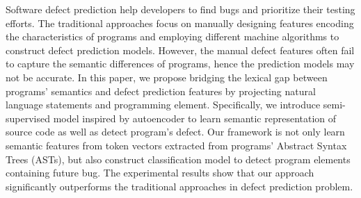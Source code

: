 

Software defect prediction help developers to find bugs and prioritize their testing efforts. The traditional approaches focus on manually designing features encoding the characteristics of programs and employing different machine algorithms to construct defect prediction models. However, the manual defect features often fail to capture the semantic differences of programs, hence the prediction models may not be accurate. 
In this paper, we propose bridging the lexical gap between programs' semantics and defect prediction features by projecting natural language statements and programming element. Specifically, we introduce semi-supervised model inspired by autoencoder to learn semantic representation of source code as well as detect program's defect. Our framework is not only learn semantic features from token vectors extracted from programs' Abstract Syntax Trees (ASTs), but also construct classification model to detect program elements containing future bug. The experimental results show that our approach significantly outperforms the traditional approaches in defect prediction problem. 



